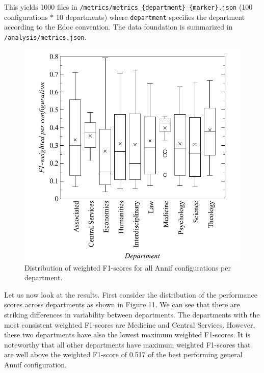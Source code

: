 \begin{Shaded}
\begin{Highlighting}[]
\OperatorTok{+} 
\end{Highlighting}
\end{Shaded}

This yields 1000 files in
\texttt{/metrics/metrics\_\{department\}\_\{marker\}.json} (100
configurations \(*\) 10 departments) where \texttt{department} specifies
the department according to the Edoc convention. The data foundation is
summarized in \texttt{/analysis/metrics.json}.

\begin{figure}
\centering
\includegraphics{images/metrics_dept_distribution.pdf}
\caption{Distribution of weighted F1-scores for all Annif configurations
per department.}
\end{figure}

Let us now look at the results. First consider the distribution of the
performance scores across departments as shown in Figure 11. We can see
that there are striking differences in variability between departments.
The departments with the most consistent weighted F1-scores are Medicine
and Central Services. However, these two departments have also the
lowest maximum weighted F1-scores. It is noteworthy that all other
departments have maximum weighted F1-scores that are well above the
weighted F1-score of 0.517 of the best performing general Annif
configuration.

